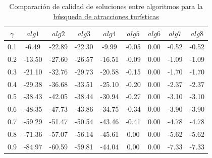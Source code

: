 \begin{table}[H]
\begin{center}
\begin{tabular}{|c|c|c|c|c|c|c|c|c|}
\hline
$\gamma$&$alg1$&$alg2$&$alg3$&$alg4$&$alg5$&$alg6$&$alg7$&$alg8$ \\ \hline
0.1 & -6.49 & -22.89 & -22.30 & -9.99 & -0.05 & 0.00 & -0.52 & -0.52 \\
0.2 & -13.50 & -27.60 & -26.57 & -16.51 & -0.09 & 0.00 & -1.09 & -1.09 \\
0.3 & -21.10 & -32.76 & -29.73 & -20.58 & -0.15 & 0.00 & -1.70 & -1.70 \\
0.4 & -29.38 & -36.68 & -33.51 & -25.10 & -0.20 & 0.00 & -2.37 & -2.37 \\
0.5 & -38.43 & -42.05 & -38.44 & -30.94 & -0.27 & 0.00 & -3.10 & -3.10 \\
0.6 & -48.35 & -47.73 & -43.86 & -34.75 & -0.34 & 0.00 & -3.90 & -3.90 \\
0.7 & -59.29 & -51.47 & -50.54 & -43.46 & -0.41 & 0.00 & -4.78 & -4.78 \\
0.8 & -71.36 & -57.07 & -56.14 & -45.61 & 0.00 & 0.00 & -5.62 & -5.62 \\
0.9 & -84.97 & -60.59 & -59.81 & -44.04 & 0.00 & 0.00 & -7.33 & -7.33 \\
\hline 
\end{tabular}
\caption{Comparación de calidad de soluciones entre algoritmos para la \hyperref[busqueda:atracciones]{búsqueda de atracciones turísticas}}
\label{tabla:comp4}
\end{center}
\end{table}

